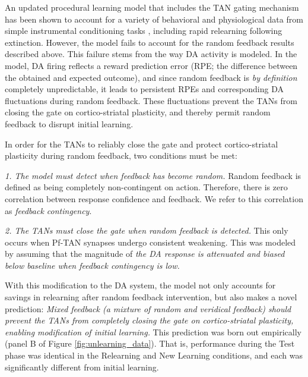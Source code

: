 An updated procedural learning model that includes the TAN gating mechanism has
been shown to account for a variety of behavioral and physiological data from
simple instrumental conditioning tasks
\cite{ashby_computational_2011,crossley_expanding_2016}, including rapid
relearning following extinction. However, the model fails to account for the
random feedback results described above. This failure stems from the way DA
activity is modeled. In the model, DA firing reflects a reward prediction error
(RPE; the difference between the obtained and expected outcome), and since
random feedback is \emph{by definition} completely unpredictable, it leads to
persistent RPEs and corresponding DA fluctuations during random feedback. These
fluctuations prevent the TANs from closing the gate on cortico-striatal
plasticity, and thereby permit random feedback to disrupt initial learning.

In order for the TANs to reliably close the gate and protect cortico-striatal
plasticity during random feedback, two conditions must be met:

\begin{description}
\item \textit{1. The model must detect when feedback has become random.} Random
  feedback is defined as being completely non-contingent on action. Therefore,
  there is zero correlation between response confidence and feedback. We refer to
  this correlation as \textit{feedback contingency}.

\item \textit{2. The TANs must close the gate when random feedback is detected.} This
  only occurs when Pf-TAN synapses undergo consistent weakening. This was modeled
  \cite{crossley_erasing_2013} by assuming that the magnitude of \textit{the DA
    response is attenuated and biased below baseline when feedback contingency is
    low.}
\end{description}

With this modification to the DA system, the model not only accounts for savings
in relearning after random feedback intervention, but also makes a novel
prediction: \textit{Mixed feedback (a mixture of random and veridical feedback)
  should prevent the TANs from completely closing the gate on cortico-striatal
  plasticity, enabling modification of initial learning.} This prediction was born
out empirically (panel B of Figure \ref{fig:unlearning_data}). That is,
performance during the Test phase was identical in the Relearning and New
Learning conditions, and each was significantly different from initial learning.

